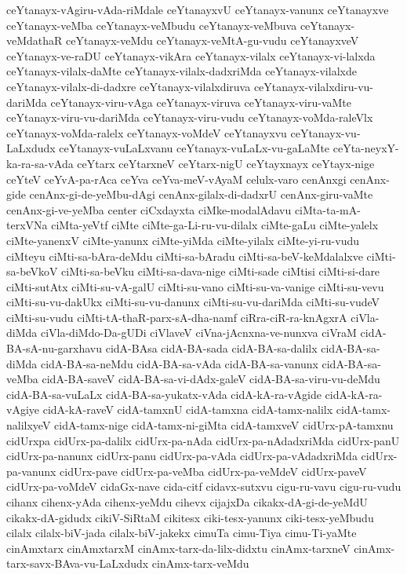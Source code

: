 {ceYtanayx-vAgiru-vAda-riMdale
ceYtanayxvU
ceYtanayx-vanunx
ceYtanayxve
ceYtanayx-veMba
ceYtanayx-veMbudu
ceYtanayx-veMbuva
ceYtanayx-veMdathaR
ceYtanayx-veMdu
ceYtanayx-veMtA-gu-vudu
ceYtanayxveV
ceYtanayx-ve-raDU
ceYtanayx-vikAra
ceYtanayx-vilalx
ceYtanayx-vi-lalxda
ceYtanayx-vilalx-daMte
ceYtanayx-vilalx-dadxriMda
ceYtanayx-vilalxde
ceYtanayx-vilalx-di-dadxre
ceYtanayx-vilalxdiruva
ceYtanayx-vilalxdiru-vu-dariMda
ceYtanayx-viru-vAga
ceYtanayx-viruva
ceYtanayx-viru-vaMte
ceYtanayx-viru-vu-dariMda
ceYtanayx-viru-vudu
ceYtanayx-voMda-raleVlx
ceYtanayx-voMda-ralelx
ceYtanayx-voMdeV
ceYtanayxvu
ceYtanayx-vu-LaLxdudx
ceYtanayx-vuLaLxvanu
ceYtanayx-vuLaLx-vu-gaLaMte
ceYta-neyxY-ka-ra-sa-vAda
ceYtarx
ceYtarxneV
ceYtarx-nigU
ceYtayxnayx
ceYtayx-nige
ceYteV
ceYvA-pa-rAca
ceYva
ceYva-meV-vAyaM
celulx-varo
cenAnxgi
cenAnx-gide
cenAnx-gi-de-yeMbu-dAgi
cenAnx-gilalx-di-dadxrU
cenAnx-giru-vaMte
cenAnx-gi-ve-yeMba
center
ciCxdayxta
ciMke-modalAdavu
ciMta-ta-mA-terxVNa
ciMta-yeVtf
ciMte
ciMte-ga-Li-ru-vu-dilalx
ciMte-gaLu
ciMte-yalelx
ciMte-yanenxV
ciMte-yanunx
ciMte-yiMda
ciMte-yilalx
ciMte-yi-ru-vudu
ciMteyu
ciMti-sa-bAra-deMdu
ciMti-sa-bAradu
ciMti-sa-beV-keMdalalxve
ciMti-sa-beVkoV
ciMti-sa-beVku
ciMti-sa-dava-nige
ciMti-sade
ciMtisi
ciMti-si-dare
ciMti-sutAtx
ciMti-su-vA-galU
ciMti-su-vano
ciMti-su-va-vanige
ciMti-su-vevu
ciMti-su-vu-dakUkx
ciMti-su-vu-danunx
ciMti-su-vu-dariMda
ciMti-su-vudeV
ciMti-su-vudu
ciMti-tA-thaR-parx-sA-dha-namf
ciRra-ciR-ra-knAgxrA
ciVla-diMda
ciVla-diMdo-Da-gUDi
ciVlaveV
ciVna-jAcnxna-ve-nunxva
ciVraM
cidA-BA-sA-nu-garxhavu
cidA-BAsa
cidA-BA-sada
cidA-BA-sa-dalilx
cidA-BA-sa-diMda
cidA-BA-sa-neMdu
cidA-BA-sa-vAda
cidA-BA-sa-vanunx
cidA-BA-sa-veMba
cidA-BA-saveV
cidA-BA-sa-vi-dAdx-galeV
cidA-BA-sa-viru-vu-deMdu
cidA-BA-sa-vuLaLx
cidA-BA-sa-yukatx-vAda
cidA-kA-ra-vAgide
cidA-kA-ra-vAgiye
cidA-kA-raveV
cidA-tamxnU
cidA-tamxna
cidA-tamx-nalilx
cidA-tamx-nalilxyeV
cidA-tamx-nige
cidA-tamx-ni-giMta
cidA-tamxveV
cidUrx-pA-tamxnu
cidUrxpa
cidUrx-pa-dalilx
cidUrx-pa-nAda
cidUrx-pa-nAdadxriMda
cidUrx-panU
cidUrx-pa-nanunx
cidUrx-panu
cidUrx-pa-vAda
cidUrx-pa-vAdadxriMda
cidUrx-pa-vanunx
cidUrx-pave
cidUrx-pa-veMba
cidUrx-pa-veMdeV
cidUrx-paveV
cidUrx-pa-voMdeV
cidaGx-nave
cida-citf
cidavx-sutxvu
cigu-ru-vavu
cigu-ru-vudu
cihanx
cihenx-yAda
cihenx-yeMdu
cihevx
cijajxDa
cikakx-dA-gi-de-yeMdU
cikakx-dA-gidudx
cikiV-SiRtaM
cikitesx
ciki-tesx-yanunx
ciki-tesx-yeMbudu
cilalx
cilalx-biV-jada
cilalx-biV-jakekx
cimuTa
cimu-Tiya
cimu-Ti-yaMte
cinAmxtarx
cinAmxtarxM
cinAmx-tarx-da-lilx-didxtu
cinAmx-tarxneV
cinAmx-tarx-savx-BAva-vu-LaLxdudx
cinAmx-tarx-veMdu
}
